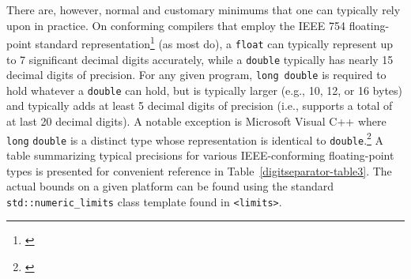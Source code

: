 There are, however, normal and customary minimums that one can typically
rely upon in practice. On conforming compilers that employ the IEEE 754
floating-point standard representation\footnote{\cite{ieee19}} (as most do),
a \lstinline!float! can typically represent up to 7 significant decimal
digits accurately, while a \lstinline!double! typically has nearly 15 decimal
digits of precision. For any given program,
\lstinline!long!~\lstinline!double! is required to hold whatever a
\lstinline!double! can hold, but is typically larger (e.g., 10, 12, or 16
bytes) and typically adds at least 5 decimal digits of precision (i.e.,
supports a total of at last 20 decimal digits). A notable exception is Microsoft Visual C++ where \lstinline!long! \lstinline!double! is a distinct type whose representation is identical to \lstinline!double!.\footnote{\cite{microsoft-types}} A table summarizing
typical precisions for various IEEE-conforming floating-point types is
presented for convenient reference in Table~\ref{digitseparator-table3}. The actual bounds on a
given platform can be found using the standard
\lstinline!std::numeric_limits! class template found in \lstinline!<limits>!.\pagebreak[4]
